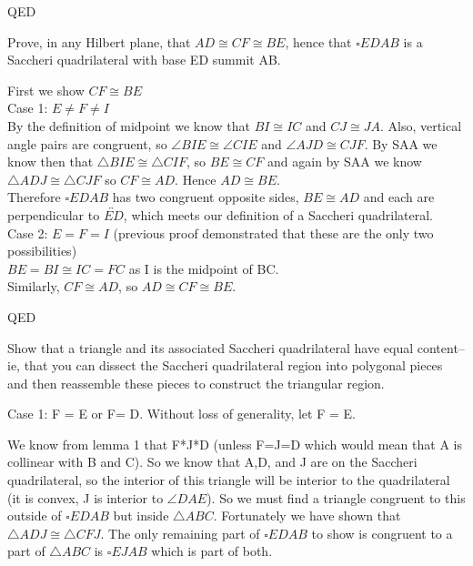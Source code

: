 \documentclass[12pt,letterpaper]{article}
\newcommand{\Proof}{\noindent {\bf Proof: }}
\newcommand{\QED}{\begin{flushright}QED\end{flushright}}
\begin{document}
\QED




\newpage 


Prove, in any Hilbert plane, that $AD \cong CF \cong BE$, hence that $\square EDAB$ is a Saccheri quadrilateral with base ED summit AB.  \\


\Proof

First we show $CF \cong BE$\\

\noindent Case 1: $E \neq F \neq I$ \\

By the definition of midpoint we know that $BI \cong IC$ and $CJ \cong JA$.  Also, vertical angle pairs are congruent, so $\angle BIE \cong \angle CIE$ and $\angle AJD \cong CJF$.  By SAA we know then that $\triangle BIE \cong \triangle CIF$, so $BE \cong CF$ and again by SAA we know $\triangle ADJ \cong \triangle CJF$ so $CF \cong AD$.  Hence $AD \cong BE$. \\

Therefore $\square EDAB$ has two congruent opposite sides, $BE \cong AD$ and each are perpendicular to $\overleftrightarrow{ED}$, which meets our definition of a Saccheri quadrilateral. \\

\noindent Case 2: $E = F = I$ (previous proof demonstrated that these are the only two possibilities)\\

$BE = BI \cong IC = FC$ as I is the midpoint of BC.\\

Similarly, $CF \cong AD$, so $AD \cong CF \cong BE$.

\QED


\newpage

Show that a triangle and its associated Saccheri quadrilateral have equal content-- ie, that you can dissect the Saccheri quadrilateral region into polygonal pieces and then reassemble these pieces to construct the triangular region. \\



\Proof

Case 1: F = E or F= D.  Without loss of generality, let F = E.

We know from lemma 1 that F*J*D (unless F=J=D which would mean that A is collinear with B and C). So we know that A,D, and J are on the Saccheri quadrilateral, so the interior of this triangle will be interior to the quadrilateral (it is convex, J is interior to $\angle DAE$).  So we must find a triangle congruent to this outside of $\square EDAB$ but inside $\triangle ABC$.  Fortunately we have shown that $\triangle ADJ \cong \triangle CFJ$. The only remaining part of $\square EDAB$ to show is congruent to a part of $\triangle ABC$ is $\square EJAB$ which is part of both.
\end{document}
